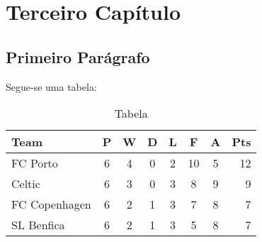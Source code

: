 \chapter{Terceiro Capítulo}

\graphicspath{{Chapters/Chapter2/Chapter2Figs/PNG/}{Chapters/Chapter2/Chapter2Figs/PDF/}{Chapters/Chapter2/Chapter2Figs/}}

\section{Primeiro Parágrafo}
Segue-se uma tabela:
\begin{table}[tbh!]
\caption{Tabela} 
\label{tab:demo-1}
\centering
\begin{tabular}{l*{6}{c}r}
\hline
Team              & P & W & D & L & F  & A & Pts \\
\hline
FC Porto & 6 & 4 & 0 & 2 & 10 & 5 & 12  \\
Celtic            & 6 & 3 & 0 & 3 &  8 & 9 &  9  \\
FC Copenhagen           & 6 & 2 & 1 & 3 &  7 & 8 &  7  \\
SL Benfica     & 6 & 2 & 1 & 3 &  5 & 8 &  7  \\
\end{tabular}
\end{table}
